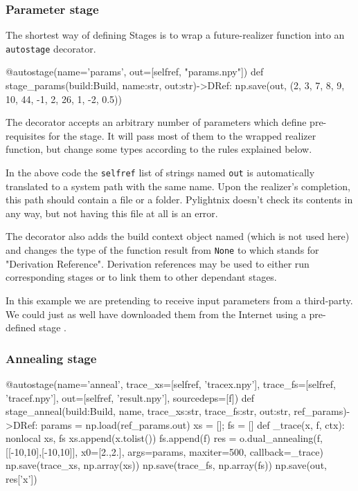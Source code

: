 \subsubsection{Parameter stage}


The shortest way of defining Stages is to wrap a future-realizer function into
an \texttt{autostage} decorator.

\begin{pythontexcode}
@autostage(name='params',
           out=[selfref, "params.npy"])
def stage_params(build:Build, name:str, out:str)->DRef:
  np.save(out, (2, 3, 7, 8, 9, 10, 44, -1, 2, 26, 1, -2, 0.5))
\end{pythontexcode}

The decorator accepts an arbitrary number of parameters which define
pre-requisites for the stage. It will pass most of them to the wrapped realizer
function, but change some types according to the rules explained below.

In the above code the \texttt{selfref} list of strings named \texttt{out}
is automatically translated to a system path with the same name. Upon the
realizer's completion, this path should contain a file or a folder. Pylightnix
doesn't check its contents in any way, but not having this file at all is an
error.

The decorator also adds the build context object named
 (which is not used here) and changes the
type of the function result from \texttt{None} to
 which stands for "Derivation Reference".
Derivation references may be used to either run corresponding stages or to link
them to other dependant stages.

In this example we are pretending to receive input parameters from a
third-party. We could just as well have downloaded them from the Internet using
a pre-defined stage .

\subsubsection{Annealing stage}

\begin{pythontexcode}

@autostage(name='anneal',
           trace_xs=[selfref, 'tracex.npy'],
           trace_fs=[selfref, 'tracef.npy'],
           out=[selfref, 'result.npy'],
           sourcedeps=[f])
def stage_anneal(build:Build, name,
                 trace_xs:str, trace_fs:str, out:str,
                 ref_params)->DRef:
  params = np.load(ref_params.out)
  xs = []; fs = []
  def _trace(x, f, ctx):
    nonlocal xs, fs
    xs.append(x.tolist())
    fs.append(f)
  res = o.dual_annealing(f, [[-10,10],[-10,10]],
                         x0=[2.,2.], args=params,
                         maxiter=500, callback=_trace)
  np.save(trace_xs, np.array(xs))
  np.save(trace_fs, np.array(fs))
  np.save(out, res['x'])
\end{pythontexcode}

